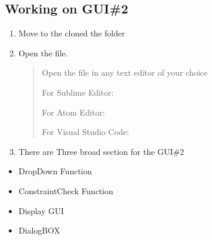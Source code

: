\documentclass[letterpaper,10pt,english]{sphinxmanual}
\begin{document}
\subsection{Working on GUI\#2}
\label{\detokenize{developer:working-on-gui-2}}\begin{enumerate}
%
\item {} 
Move to the cloned the folder
\begin{quote}

\begin{sphinxVerbatim}[commandchars=\\\{\}]
 
\end{sphinxVerbatim}
\end{quote}

\item {} 
Open the  file.
\begin{quote}

Open the  file in any text editor of your choice

For Sublime Editor:

\begin{sphinxVerbatim}[commandchars=\\\{\}]
 
\end{sphinxVerbatim}

For Atom Editor:

\begin{sphinxVerbatim}[commandchars=\\\{\}]
 
\end{sphinxVerbatim}

For Visual Studio Code:

\begin{sphinxVerbatim}[commandchars=\\\{\}]
 
\end{sphinxVerbatim}
\end{quote}

\item {} 
There are Three broad section for the GUI\#2

\end{enumerate}
\begin{itemize}
\item {} 
DropDown Function

\item {} 
ConstraintCheck Function

\item {} 
Display GUI

\item {} 
DialogBOX

\end{itemize}
\end{document}

